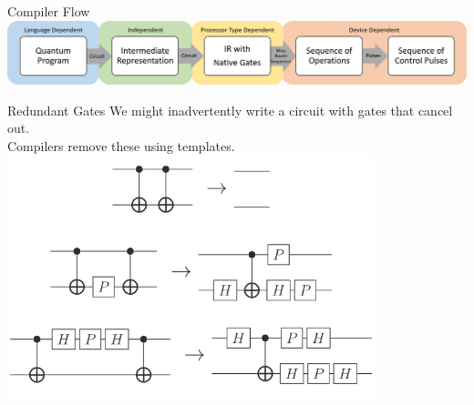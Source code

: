 \documentclass{beamer}
\begin{document}
\begin{frame}[label=compiler]{Compiler Flow}
\label{compiler}
\centering
\includegraphics[width=\textwidth]{images/Flow-diagram-colours2.png}
\end{frame}

\begin{frame}{Redundant Gates}
    We might inadvertently write a circuit with gates that cancel out.\\
    Compilers remove these using templates.\\
    \centering
    \includegraphics[width=0.8\textwidth]{images/circuit templates.png}
\end{frame}
\end{document}
